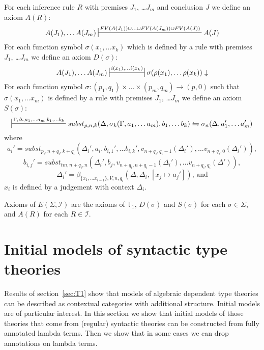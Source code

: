 \documentclass[reqno]{amsart}
\theoremstyle{definition}
\theoremstyle{remark}
\numberwithin{figure}{section}
\begin{document}
For each inference rule $R$ with premises $J_1$, \ldots $J_m$ and conclusion $J$ we define an axiom $A(R)$:
\[ A(J_1), \ldots A(J_m) \sststile{}{FV(A(J_1)) \cup \ldots \cup FV(A(J_m)) \cup FV(A(J))} A(J) \]
For each function symbol $\sigma(x_1, \ldots x_k)$ which is defined by a rule with premises $J_1$, \ldots $J_m$ we define an axiom $D(\sigma)$:
\[ A(J_1), \ldots A(J_m) \ssststile{}{i(x_1), \ldots i(x_k)} \sigma(\rho(x_1), \ldots \rho(x_k)) \downarrow \]
For each function symbol $\sigma : (p_1,q_1) \times \ldots \times (p_m,q_m) \to (p,0)$ such that $\sigma(x_1, \ldots x_m)$ is defined by a rule with premises $J_1$, \ldots $J_m$ we define an axiom $S(\sigma)$:
\[ \sststile{}{\Gamma, \Delta, a_1, \ldots a_m, b_1, \ldots b_k} subst_{p,n,k}(\Delta, \sigma_k(\Gamma, a_1, \ldots a_m), b_1, \ldots b_k) \leftrightharpoons \sigma_n(\Delta, a_1', \ldots a_m') \]
where
\[ a_i' = subst_{p_i,n+q_i,k+q_i}(\Delta_i', a_i, b_{i,1}', \ldots b_{i,k}', v_{n+q_i,q_i-1}(\Delta_i'), \ldots v_{n+q_i,0}(\Delta_i')), \]
\[ b_{i,j}' = subst_{tm,n+q_i,n}(\Delta_i', b_j, v_{n+q_i,n+q_i-1}(\Delta_i'), \ldots v_{n+q_i,q_i}(\Delta')), \]
\[ \Delta_i' = \beta_{\{ x_1, \ldots x_{i-1} \},V,n,q_i}(\Delta, \Delta_i, [x_j \mapsto a_j']) \text{, and} \]
$x_i$ is defined by a judgement with context $\Delta_i$.

Axioms of $E(\Sigma, \mathcal{I})$ are the axioms of $\mathbb{T}_1$, $D(\sigma)$ and $S(\sigma)$ for each $\sigma \in \Sigma$, and $A(R)$ for each $R \in \mathcal{I}$.

\section{Initial models of syntactic type theories}

Results of section~\ref{sec:T1} show that models of algebraic dependent type theories can be described as contextual categories with additional structure.
Initial models are of particular interest.
In this section we show that initial models of those theories that come from (regular) syntactic theories can be constructed from fully annotated lambda terms.
Then we show that in some cases we can drop annotations on lambda terms.



\end{document}
